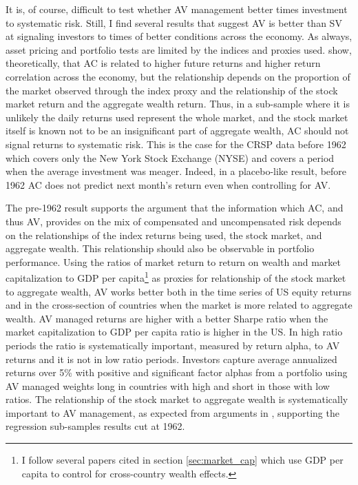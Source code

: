 It is, of course, difficult to test whether AV management better times investment to systematic risk. Still, I find several results that suggest AV is better than SV at signaling investors to times of better conditions across the economy. As always, asset pricing and portfolio tests are limited by the indices and proxies used. \citet{pollet_average_2010} show, theoretically, that AC is related to higher future returns and higher return correlation across the economy, but the relationship depends on the proportion of the market observed through the index proxy and the relationship of the stock market return and the aggregate wealth return. Thus, in a sub-sample where it is unlikely the daily returns used represent the whole market, and the stock market itself is known not to be an insignificant part of aggregate wealth, AC should not signal returns to systematic risk. This is the case for the CRSP data before 1962 which covers only the New York Stock Exchange (NYSE) and covers a period when the average investment was meager. \citep{taylor_2014} Indeed, in a placebo-like result, before 1962 AC does not predict next month's return even when controlling for AV.

The pre-1962 result supports the \citet{pollet_average_2010} argument that the information which AC, and thus AV, provides on the mix of compensated and uncompensated risk depends on the relationships of the index returns being used, the stock market, and aggregate wealth. This relationship should also be observable in portfolio performance. Using the ratios of market return to return on wealth and market capitalization to GDP per capita\footnote{I follow several papers cited in section \ref{sec:market_cap} which use GDP per capita to control for cross-country wealth effects.} as proxies for relationship of the stock market to aggregate wealth, AV works better both in the time series of US equity returns and in the cross-section of countries when the market is more related to aggregate wealth. AV managed returns are higher with a better Sharpe ratio when the market capitalization to GDP per capita ratio is higher in the US. In high ratio periods the ratio is systematically important, measured by return alpha, to AV returns and it is not in low ratio periods.  Investors capture average annualized returns over 5\% with positive and significant factor alphas from a portfolio using AV managed weights long in countries with high and short in those with low ratios. The relationship of the stock market to aggregate wealth is systematically important to AV management, as expected from arguments in \cite{pollet_average_2010}, supporting the regression sub-samples results cut at 1962.

